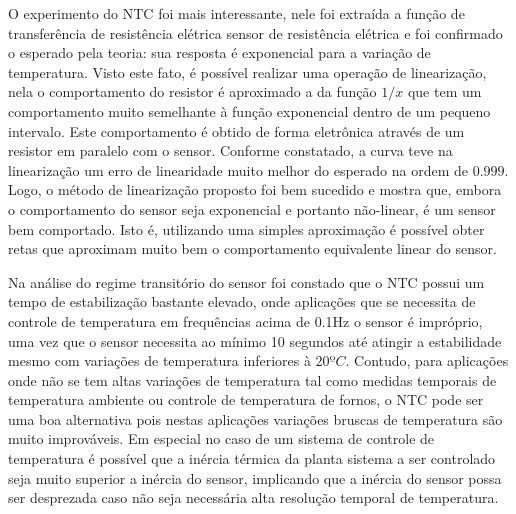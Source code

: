 \documentclass[a4paper]{instrumentacao}
\begin{document}
O experimento do NTC foi mais interessante, nele foi extraída a função de transferência de resistência elétrica sensor de resistência elétrica e foi confirmado o esperado pela teoria: sua resposta é exponencial para a variação de temperatura. Visto este fato, é possível realizar uma operação de linearização, nela o comportamento do resistor é aproximado a da função $1/x$ que tem um comportamento muito semelhante à função exponencial dentro de um pequeno intervalo. Este comportamento é obtido de forma eletrônica através de um resistor em paralelo com o sensor. Conforme constatado, a curva teve na linearização um erro de linearidade muito melhor do esperado na ordem de $0.999$. Logo, o método de linearização proposto foi bem sucedido e mostra que, embora o comportamento do sensor seja exponencial e portanto não-linear, é um sensor bem comportado. Isto é, utilizando uma simples aproximação é possível obter retas que aproximam muito bem o comportamento equivalente linear do sensor.

Na análise do regime transitório do sensor foi constado que o NTC possui um tempo de estabilização bastante elevado, onde aplicações que se necessita de controle de temperatura em frequências acima de 0.1Hz o sensor é impróprio, uma vez que o sensor necessita ao mínimo 10 segundos até atingir a estabilidade mesmo com variações de temperatura inferiores à $20ºC$. Contudo, para aplicações onde não se tem altas variações de temperatura tal como medidas temporais de temperatura ambiente ou controle de temperatura de fornos, o NTC pode ser uma boa alternativa pois nestas aplicações variações bruscas de temperatura são muito improváveis. Em especial no caso de um sistema de controle de temperatura é possível que a inércia térmica da planta sistema a ser controlado seja muito superior a inércia do sensor, implicando que a inércia do sensor possa ser desprezada caso não seja necessária alta resolução temporal de temperatura.
\end{document}
